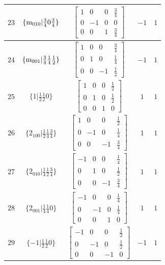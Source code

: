 \documentclass[fleqn,8pt]{jsarticle}
\begin{document}
\begin{longtable}{ccccc}
$ 23 $ & $ \{{\rm m}_{010}|\frac{3}{4} 0 \frac{3}{4}\} $ & $ \begin{bmatrix} 1 & 0 & 0 & \frac{3}{4} \\ 0 & -1 & 0 & 0 \\ 0 & 0 & 1 & \frac{3}{4} \end{bmatrix} $ & $ -1 $ & $ 1 $ \\ \hline
$ 24 $ & $ \{{\rm m}_{001}|\frac{3}{4} \frac{1}{4} \frac{1}{2}\} $ & $ \begin{bmatrix} 1 & 0 & 0 & \frac{3}{4} \\ 0 & 1 & 0 & \frac{1}{4} \\ 0 & 0 & -1 & \frac{1}{2} \end{bmatrix} $ & $ -1 $ & $ 1 $ \\ \hline
$ 25 $ & $ \{1|\frac{1}{2} \frac{1}{2} 0\} $ & $ \begin{bmatrix} 1 & 0 & 0 & \frac{1}{2} \\ 0 & 1 & 0 & \frac{1}{2} \\ 0 & 0 & 1 & 0 \end{bmatrix} $ & $ 1 $ & $ 1 $ \\ \hline
$ 26 $ & $ \{2{}_{100}|\frac{1}{2} \frac{1}{4} \frac{3}{4}\} $ & $ \begin{bmatrix} 1 & 0 & 0 & \frac{1}{2} \\ 0 & -1 & 0 & \frac{1}{4} \\ 0 & 0 & -1 & \frac{3}{4} \end{bmatrix} $ & $ 1 $ & $ 1 $ \\ \hline
$ 27 $ & $ \{2{}_{010}|\frac{1}{4} \frac{1}{2} \frac{3}{4}\} $ & $ \begin{bmatrix} -1 & 0 & 0 & \frac{1}{4} \\ 0 & 1 & 0 & \frac{1}{2} \\ 0 & 0 & -1 & \frac{3}{4} \end{bmatrix} $ & $ 1 $ & $ 1 $ \\ \hline
$ 28 $ & $ \{2{}_{001}|\frac{1}{4} \frac{1}{4} 0\} $ & $ \begin{bmatrix} -1 & 0 & 0 & \frac{1}{4} \\ 0 & -1 & 0 & \frac{1}{4} \\ 0 & 0 & 1 & 0 \end{bmatrix} $ & $ 1 $ & $ 1 $ \\ \hline
$ 29 $ & $ \{-1|\frac{1}{2} \frac{1}{2} 0\} $ & $ \begin{bmatrix} -1 & 0 & 0 & \frac{1}{2} \\ 0 & -1 & 0 & \frac{1}{2} \\ 0 & 0 & -1 & 0 \end{bmatrix} $ & $ -1 $ & $ 1 $ \\ \hline

\end{longtable}
\end{document}
